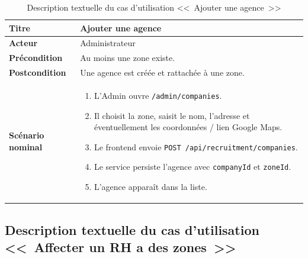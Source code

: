 \begin{table}[htbp]
  \centering
  \small
  \caption{Description textuelle du cas d'utilisation <<~Ajouter une agence~>>}
  \label{tab:uc-add-company}
  \begin{tabular}{|p{3.0cm}|p{10.2cm}|}
    \hline
    \textbf{Titre} & Ajouter une agence \\
    \hline
    \textbf{Acteur} & Administrateur \\
    \hline
    \textbf{Précondition} & Au moins une zone existe. \\
    \hline
    \textbf{Postcondition} & Une agence est créée et rattachée à une zone. \\
    \hline
    \textbf{Scénario nominal}
    &
    \begin{enumerate}[leftmargin=*,itemsep=0.15em,topsep=0.2em]
      \item L'Admin ouvre \texttt{/admin/companies}.
      \item Il choisit la zone, saisit le nom, l'adresse et éventuellement
            les coordonnées / lien Google Maps.
      \item Le frontend envoie \texttt{POST /api/recruitment/companies}.
      \item Le service persiste l'agence avec \texttt{companyId} et \texttt{zoneId}.
      \item L'agence apparaît dans la liste.
    \end{enumerate}
    \\
    \hline
  \end{tabular}
\end{table}


\subsection{Description textuelle du cas d'utilisation <<~Affecter un RH a des zones~>>}

